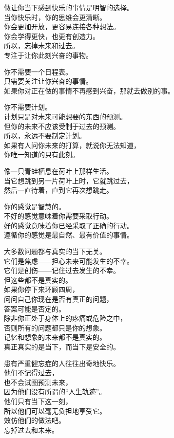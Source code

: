 \documentclass[
]{article}
\begin{document}
做让你当下感到快乐的事情是明智的选择。\\
当你快乐时，你的思维会更清晰。\\
你会更加开放，更容易连接各种想法。\\
你会学得更快，也更有创造力。\\
所以，忘掉未来和过去。\\
专注于让你此刻兴奋的事物。

你不需要一个日程表。\\
只需要关注让你兴奋的事情。\\
如果你对正在做的事情不再感到兴奋，那就去做别的事。

你不需要计划。\\
计划只是对未来可能想要的东西的预测。\\
但你的未来不应该受制于过去的预测。\\
所以，永远不要制定计划。\\
如果有人问你未来的打算，就说你无法知道，\\
你唯一知道的只有此刻。

像一只青蛙栖息在荷叶上那样生活。\\
当它想跳到另一片荷叶上时，它就跳过去，\\
然后一直待着，直到它再次想跳走。

你的感觉是智慧的。\\
不好的感觉意味着你需要采取行动。\\
好的感觉意味着你已经采取了正确的行动。\\
遵循你的感觉是最自然、最有价值的事情。

大多数问题都与真实的当下无关。\\
它们是焦虑------担心未来可能发生的不幸。\\
它们是创伤------记住过去发生的不幸。\\
但这些都不是真实的。\\
如果你停下来环顾四周，\\
问问自己你现在是否有真正的问题，\\
答案可能是否定的。\\
除非你正处于身体上的疼痛或危险之中，\\
否则所有的问题都只是你的想象。\\
记忆和想象的未来都不是真实的。\\
真正真实的是当下，而当下是安全的。

患有严重健忘症的人往往出奇地快乐。\\
他们不记得过去，\\
也不会试图预测未来，\\
因为他们没有所谓的``人生轨迹''。\\
他们只有当下这一刻，\\
所以他们可以毫无负担地享受它。\\
效仿他们的做法吧。\\
忘掉过去和未来。
\end{document}
